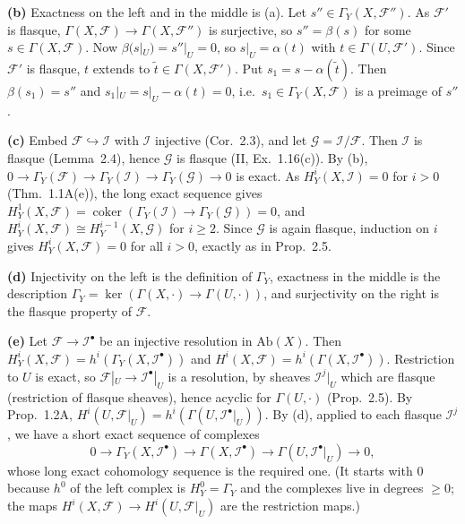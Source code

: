\documentclass[11pt]{article}
\begin{document}
\textbf{(b)} Exactness on the left and in the middle is (a). Let $s''\in\Gamma_Y(X,\mathcal F'')$. As $\mathcal F'$ is flasque, $\Gamma(X,\mathcal F)\to\Gamma(X,\mathcal F'')$ is surjective, so $s''=\beta(s)$ for some $s\in\Gamma(X,\mathcal F)$. Now $\beta(s|_U)=s''|_U=0$, so $s|_U=\alpha(t)$ with $t\in\Gamma(U,\mathcal F')$. Since $\mathcal F'$ is flasque, $t$ extends to $\tilde t\in\Gamma(X,\mathcal F')$. Put $s_1=s-\alpha(\tilde t)$. Then $\beta(s_1)=s''$ and $s_1|_U=s|_U-\alpha(t)=0$, i.e.\ $s_1\in\Gamma_Y(X,\mathcal F)$ is a preimage of $s''$.

\textbf{(c)} Embed $\mathcal F\hookrightarrow\mathcal I$ with $\mathcal I$ injective (Cor.~2.3), and let $\mathcal G=\mathcal I/\mathcal F$. Then $\mathcal I$ is flasque (Lemma~2.4), hence $\mathcal G$ is flasque (II, Ex.~1.16(c)). By (b), $0\to\Gamma_Y(\mathcal F)\to\Gamma_Y(\mathcal I)\to\Gamma_Y(\mathcal G)\to0$ is exact. As $H^i_Y(X,\mathcal I)=0$ for $i>0$ (Thm.~1.1A(e)), the long exact sequence gives $H^1_Y(X,\mathcal F)=\operatorname{coker}(\Gamma_Y(\mathcal I)\to\Gamma_Y(\mathcal G))=0$, and $H^i_Y(X,\mathcal F)\cong H^{i-1}_Y(X,\mathcal G)$ for $i\ge2$. Since $\mathcal G$ is again flasque, induction on $i$ gives $H^i_Y(X,\mathcal F)=0$ for all $i>0$, exactly as in Prop.~2.5.

\textbf{(d)} Injectivity on the left is the definition of $\Gamma_Y$, exactness in the middle is the description $\Gamma_Y=\ker(\Gamma(X,\cdot)\to\Gamma(U,\cdot))$, and surjectivity on the right is the flasque property of $\mathcal F$.

\textbf{(e)} Let $\mathcal F\to\mathcal I^\bullet$ be an injective resolution in $\mathrm{Ab}(X)$. Then $H^i_Y(X,\mathcal F)=h^i(\Gamma_Y(X,\mathcal I^\bullet))$ and $H^i(X,\mathcal F)=h^i(\Gamma(X,\mathcal I^\bullet))$. Restriction to $U$ is exact, so $\mathcal F|_U\to\mathcal I^\bullet|_U$ is a resolution, by sheaves $\mathcal I^j|_U$ which are flasque (restriction of flasque sheaves), hence acyclic for $\Gamma(U,\cdot)$ (Prop.~2.5). By Prop.~1.2A, $H^i(U,\mathcal F|_U)=h^i(\Gamma(U,\mathcal I^\bullet|_U))$. By (d), applied to each flasque $\mathcal I^j$, we have a short exact sequence of complexes
\[
0\to\Gamma_Y(X,\mathcal I^\bullet)\to\Gamma(X,\mathcal I^\bullet)\to\Gamma(U,\mathcal I^\bullet|_U)\to0,
\]
whose long exact cohomology sequence is the required one. (It starts with $0$ because $h^0$ of the left complex is $H^0_Y=\Gamma_Y$ and the complexes live in degrees $\ge0$; the maps $H^i(X,\mathcal F)\to H^i(U,\mathcal F|_U)$ are the restriction maps.)
\end{document}
